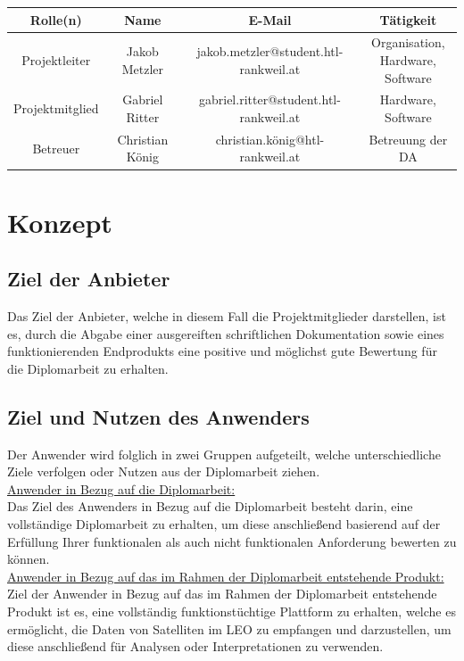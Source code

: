 \begin{tabular}{|c|c|c|c|}
	\hline
	Rolle(n) & Name & E-Mail & Tätigkeit \\
	\hline
	Projektleiter & Jakob Metzler & jakob.metzler@student.htl-rankweil.at & \parbox{2cm}{Organisation,\\ Hardware, Software}\\
	\hline
	Projektmitglied & Gabriel Ritter & gabriel.ritter@student.htl-rankweil.at & Hardware, Software \\
	\hline
	Betreuer & Christian König & christian.könig@htl-rankweil.at & Betreuung der DA \\
	\hline
\end{tabular}

\section{Konzept}
\subsection{Ziel der Anbieter}
Das Ziel der Anbieter, welche in diesem Fall die Projektmitglieder darstellen, ist es, durch die Abgabe 
einer ausgereiften schriftlichen Dokumentation sowie eines funktionierenden Endprodukts eine 
positive und möglichst gute Bewertung für die Diplomarbeit zu erhalten.

\subsection{Ziel und Nutzen des Anwenders}
Der Anwender wird folglich in zwei Gruppen aufgeteilt, welche unterschiedliche Ziele verfolgen oder 
Nutzen aus der Diplomarbeit ziehen.\\

\underline{Anwender in Bezug auf die Diplomarbeit:}\\
Das Ziel des Anwenders in Bezug auf die Diplomarbeit besteht darin, eine vollständige Diplomarbeit zu 
erhalten, um diese anschließend basierend auf der Erfüllung Ihrer funktionalen als auch nicht
funktionalen Anforderung bewerten zu können. \\
\underline{Anwender in Bezug auf das im Rahmen der Diplomarbeit entstehende Produkt:}\\ 
Ziel der Anwender in Bezug auf das im Rahmen der Diplomarbeit entstehende Produkt ist es, eine 
vollständig funktionstüchtige Plattform zu erhalten, welche es ermöglicht, die Daten von Satelliten im 
LEO zu empfangen und darzustellen, um diese anschließend für Analysen oder Interpretationen zu 
verwenden.

